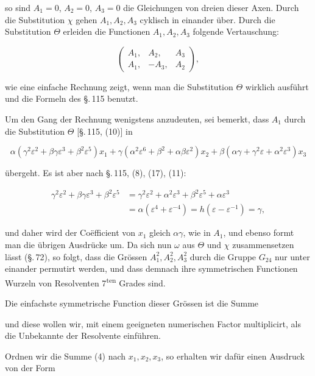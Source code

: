 
so sind $A_1=0$, $A_2=0$, $A_3=0$ die Gleichungen von dreien dieser Axen. Durch die Substitution $\chi$ gehen $A_1, A_2, A_3$ cyklisch in einander über. Durch die Substitution $\Theta$ erleiden die Functionen $A_1, A_2, A_3$ folgende Vertauschung:

\[
\begin{pmatrix} A_1, & A_2, & A_3 \\ A_1, & -A_3, & A_2 \end{pmatrix},
\]

wie eine einfache Rechnung zeigt, wenn man die Substitution $\Theta$ wirklich ausführt und die Formeln des \S.\,115 benutzt.

Um den Gang der Rechnung wenigstens anzudeuten, sei bemerkt, dass $A_1$ durch die Substitution $\Theta$ [\S.\,115, (10)] in

\[
\alpha(\gamma^2\varepsilon^2 + \beta\gamma\varepsilon^3 + \beta^2\varepsilon^5)x_1 + \gamma(\alpha^2\varepsilon^6 + \beta^2 + \alpha\beta\varepsilon^2)x_2 + \beta(\alpha\gamma + \gamma^2\varepsilon + \alpha^2\varepsilon^3)x_3
\]

übergeht. Es ist aber nach \S.\,115, (8), (17), (11):

\[
\begin{aligned}
\gamma^2\varepsilon^2 + \beta\gamma\varepsilon^3 + \beta^2\varepsilon^5 &= \gamma^2\varepsilon^2 + \alpha^2\varepsilon^3 + \beta^2\varepsilon^5 + \alpha\varepsilon^3 \\
&= \alpha(\varepsilon^4+\varepsilon^{-4}) = h(\varepsilon-\varepsilon^{-1}) = \gamma,
\end{aligned}
\]

und daher wird der Coëfficient von $x_1$ gleich $\alpha\gamma$, wie in $A_1$, und ebenso formt man die übrigen Ausdrücke um. Da sich nun $\omega$ aus $\Theta$ und $\chi$ zusammensetzen lässt (\S.\,72), so folgt, dass die Grössen $A_1^2, A_2^2, A_3^2$ durch die Gruppe $G_{24}$ nur unter einander permutirt werden, und dass demnach ihre symmetrischen Functionen Wurzeln von Resolventen 7\textsuperscript{ten} Grades sind.

Die einfachste symmetrische Function dieser Grössen ist die Summe


und diese wollen wir, mit einem geeigneten numerischen Factor multiplicirt, als die Unbekannte der Resolvente einführen.

Ordnen wir die Summe (4) nach $x_1, x_2, x_3$, so erhalten wir dafür einen Ausdruck von der Form

